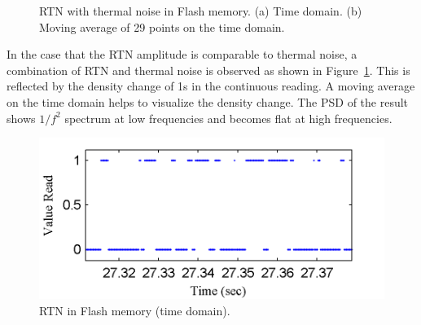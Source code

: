 \begin{figure}
  \centering
  
  \caption{RTN with thermal noise in Flash memory. (a) Time domain. (b) Moving average of 29 points on the time domain.}
  \label{fig:thermal_rtn}
\end{figure}

In the case that the RTN amplitude is comparable to thermal noise, a combination of RTN and thermal noise is observed as shown in Figure~\ref{fig:thermal_rtn}. This is reflected by the density change of 1s in the continuous reading. A moving average on the time domain helps to visualize the density change. The PSD of the result shows $1/{f}^2$ spectrum at low frequencies and becomes flat at high frequencies.

\begin{figure} 
\begin{center} 
\includegraphics[width=\mywidth]{figs/rtn.png} 
\caption{RTN in Flash memory (time domain).}
\label{fig:rtn} 
\vspace{-0.25in}
\end{center} 
\end{figure} 

